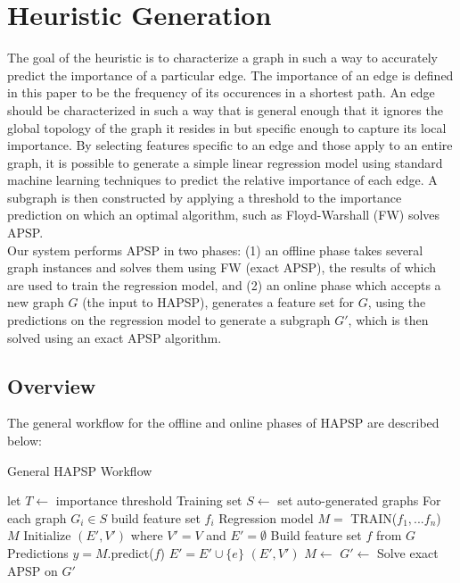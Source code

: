 \documentclass[journal]{IEEEtran}
\begin{document}
\section{Heuristic Generation}
The goal of the heuristic is to characterize a graph in such a way to accurately predict
the importance of a particular edge. The importance of an edge is defined in this paper to be the frequency of
its occurences in a shortest path. An edge should be characterized in such a way that is general enough
that it ignores the global topology of the graph it resides in but specific enough to capture its local
importance. By selecting features specific to an edge and those apply to an entire graph, it is possible to
generate a simple linear regression model using standard machine learning techniques to predict
the relative importance of each edge. A subgraph is then constructed by applying a threshold to the importance
prediction on which an optimal algorithm, such as Floyd-Warshall (FW) solves APSP.\\

Our system performs APSP in two phases: (1) an offline phase takes several graph instances and solves them
using FW (exact APSP), the results of which are used to train the regression model, and (2) an online phase
which accepts a new graph $G$ (the input to HAPSP), generates a feature set for $G$, using the predictions
on the regression model to generate a subgraph $G'$, which is then solved using an exact APSP algorithm.

\subsection{Overview}
	The general workflow for the offline and online phases of HAPSP are described below:
	\begin{algorithm}
	\caption{General HAPSP Workflow}
	\begin{algorithmic}[1]
	\State let $T\leftarrow$ importance threshold
		\State Training set $S\leftarrow$ set auto-generated graphs
		\State For each graph $G_i\in S$ build feature set $f_i$
		\State Regression model $M = $ TRAIN($f_1,...f_n$)
		\State\Return $M$
	\EndProcedure
		\State Initialize $(E',V')$ where $V'=V$ and $E' = \emptyset$
		\State Build feature set $f$ from $G$
		\State Predictions $y = M$.predict($f$)
				\State $E'=E'\cup \{e\}$
			\EndIf
		\EndFor
		\State\Return $(E',V')$
	\EndProcedure
		\State $M\leftarrow$
		\State $G'\leftarrow$
		\State Solve exact APSP on $G'$
	\EndProcedure
	\end{algorithmic}
	\label{fig:alg_offline}
	\end{algorithm}
\end{document}
